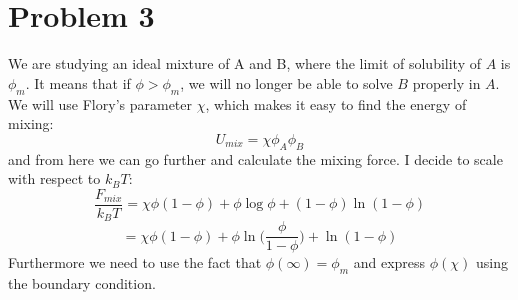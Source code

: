\documentclass[norsk,a4paper,12pt]{article}
\begin{document}
\section*{Problem 3}
We are studying an ideal mixture of A and B, where the limit of solubility of $A$ is $\phi_m$. It means that if $\phi>\phi_m$, we will no longer be able to solve $B$ properly in $A$. We will use Flory's parameter $\chi$, which makes it easy to find the energy of mixing:
\begin{equation}
U_{mix}=\chi\phi_A\phi_B
\end{equation}
and from here we can go further and calculate the mixing force. I decide to scale with respect to $k_BT$:
$$\frac{F_{mix}}{k_BT}=\chi\phi(1-\phi)+\phi\log\phi+(1-\phi)\ln(1-\phi)$$
$$=\chi\phi(1-\phi)+\phi\ln\bigg(\frac{\phi}{1-\phi}\bigg)+\ln(1-\phi)$$
Furthermore we need to use the fact that $\phi(\infty)=\phi_m$ and express $\phi(\chi)$ using the boundary condition.
\end{document}
